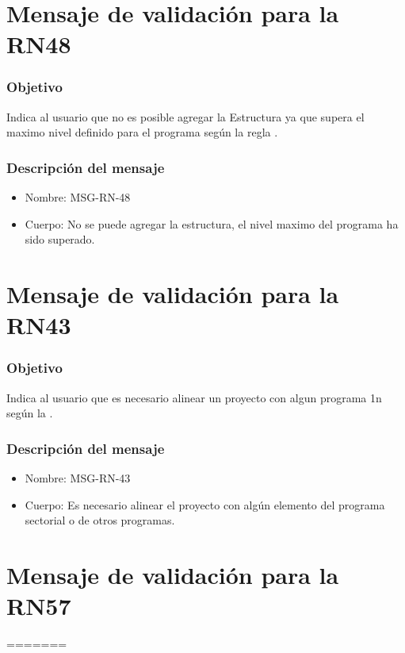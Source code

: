 \section{Mensaje de validación para la RN48} \label{MSG_RN48}

\subsubsection{Objetivo}
Indica al usuario que no es posible agregar la Estructura ya que supera el maximo nivel definido para el programa según la regla .

\subsubsection{Descripción del mensaje}
\begin{itemize}
\item Nombre: MSG-RN-48
\item Cuerpo: No se puede agregar la estructura, el nivel maximo del programa ha sido superado.
\end{itemize}

\section{Mensaje de validación para la RN43} \label{MSG_RN43}

\subsubsection{Objetivo}
Indica al usuario que es necesario alinear un proyecto con algun programa 1n según la .

\subsubsection{Descripción del mensaje}
\begin{itemize}
\item Nombre: MSG-RN-43
\item Cuerpo: Es necesario alinear el proyecto con algún elemento del programa sectorial o de otros programas.
\end{itemize}

\section{Mensaje de validación para la RN57} \label{MSG_RN57}
=======
